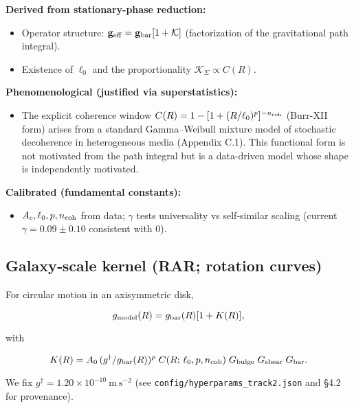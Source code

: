 \documentclass[11pt,a4paper]{article}
\begin{document}
\textbf{Derived from stationary-phase reduction:}

\begin{itemize}
\item Operator structure: $\mathbf{g}_{\rm eff}=\mathbf{g}_{\rm bar}[1+\mathcal{K}]$ (factorization of the gravitational path integral).
\item Existence of $\ell_0$ and the proportionality $\mathcal{K}_\Sigma\propto C(R)$.
\end{itemize}


\textbf{Phenomenological (justified via superstatistics):}

\begin{itemize}
\item The explicit coherence window $C(R)=1-[1+(R/\ell_0)^p]^{-n_{\rm coh}}$ (Burr-XII form) arises from a standard Gamma–Weibull mixture model of stochastic decoherence in heterogeneous media (Appendix C.1). This functional form is not motivated from the path integral but is a data-driven model whose shape is independently motivated.
\end{itemize}


\textbf{Calibrated (fundamental constants):}

\begin{itemize}
\item $A_c,\ell_0,p,n_{\rm coh}$ from data; $\gamma$ tests universality vs self‑similar scaling (current $\gamma=0.09\pm0.10$ consistent with 0).
\end{itemize}



\subsection{Galaxy‑scale kernel (RAR; rotation curves)}


For circular motion in an axisymmetric disk,


\begin{equation}
g_{\rm model}(R) = g_{\rm bar}(R)[1 + K(R)],
\end{equation}


with


\begin{equation}
K(R) = A_0\, (g^\dagger/g_{\rm bar}(R))^p\; C(R;\,\ell_0, p, n_{\rm coh})\; G_{\rm bulge}\; G_{\rm shear}\; G_{\rm bar}.
\end{equation}


We fix $g^† = 1.20 \times 10^{-10}~\mathrm{m~s}^{-2}$ (see \texttt{config/hyperparams\_track2.json} and §4.2 for provenance).
\end{document}
